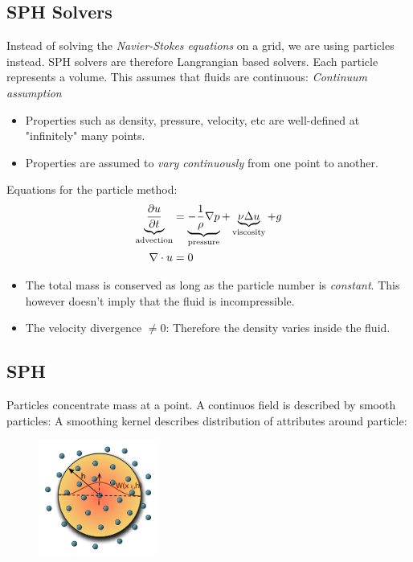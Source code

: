 \begin{multicols}{2}
\section{SPH Solvers}
Instead of solving the \emph{Navier-Stokes equations} on a grid, we are using particles instead. SPH solvers are therefore Langrangian based solvers. 
Each particle represents a volume. This assumes that fluids are continuous: \emph{Continuum assumption}
\begin{itemize}
	\item Properties such as density, pressure, velocity, etc are well-defined at "infinitely" many points.
	\item Properties are assumed to \emph{vary continuously} from one point to another.
\end{itemize}
Equations for the particle method:
		\begin{align*}
			\underbrace{{\partial u \over \partial t}}_\text{advection}
				&= 
			\underbrace{-{1\over \rho}\nabla p}_\text{pressure} +
			\underbrace{\nu \Delta u}_\text{viscosity} + g\\
			\nabla \cdot u &= 0
		\end{align*}
\begin{itemize}
	\item The total mass is conserved as long as the particle number is \emph{constant}. This however doesn't imply that the fluid is incompressible.
	\item The velocity divergence $\neq 0$: Therefore the density varies inside the fluid.
\end{itemize}

\subsection{SPH}
Particles concentrate mass at a point. A continuos field is described by smooth particles: A smoothing kernel describes distribution of attributes around particle:
\begin{figure}[H]
	\centering
	\includegraphics[width=0.35\textwidth]{img/05_sph}
\end{figure}


\end{multicols}
